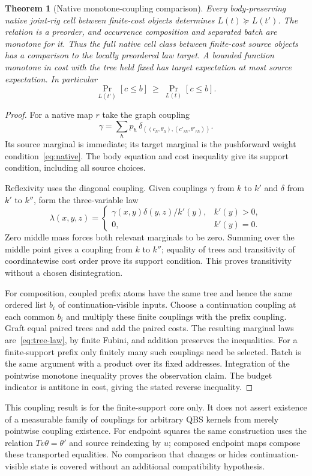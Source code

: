 \documentclass[11pt,a4paper]{article}
\newtheorem{theorem}{Theorem}[section]
\theoremstyle{definition}
\begin{document}
\begin{theorem}[Native monotone-coupling comparison]\label{thm:coupling}
Every body-preserving native joint-rig cell between finite-cost objects
determines $L(t)\succeq L(t')$.
The relation is a preorder, and occurrence composition and separated batch
are monotone for it. Thus the full native cell class between finite-cost source objects has
a comparison to the locally preordered law target. A bounded function monotone in cost with the
tree held fixed has target expectation at most source expectation.
In particular
\[
 \Pr_{L(t')}[c\le b]\ \ge\ \Pr_{L(t)}[c\le b].
\]
\end{theorem}
\begin{proof}
For a native map $r$ take the graph coupling
\begin{equation}\label{eq:graph-coupling}
 \gamma=\sum_h p_h\,
 \delta_{((c_h,\theta_h),(c'_{rh},\theta'_{rh}))}.
\end{equation}
Its source marginal is immediate; its target marginal is the pushforward
weight condition~\eqref{eq:native}. The body equation and cost inequality
give its support condition, including all source choices.

Reflexivity uses the diagonal coupling. Given couplings $\gamma$ from
$k$ to $k'$ and $\delta$ from $k'$ to $k''$, form the three-variable law
\[
 \lambda(x,y,z)=
 \begin{cases}
 \gamma(x,y)\delta(y,z)/k'(y),&k'(y)>0,\\
 0,&k'(y)=0.
 \end{cases}
\]
Zero middle mass forces both relevant marginals to be zero. Summing over
the middle point gives a coupling from $k$ to $k''$; equality of trees and
transitivity of coordinatewise cost order prove its support condition.
This proves transitivity without a chosen disintegration.

For composition, coupled prefix atoms have the same tree and hence the
same ordered list $b_i$ of continuation-visible inputs. Choose a continuation
coupling at each common $b_i$ and multiply these finite couplings with the
prefix coupling. Graft equal paired trees and add the paired costs.
The resulting marginal laws are~\eqref{eq:tree-law}, by finite Fubini,
and addition preserves the inequalities. For a finite-support prefix only
finitely many such couplings need be selected. Batch is the same argument
with a product over its fixed addresses. Integration of the pointwise
monotone inequality proves the observation claim. The budget indicator is
antitone in cost, giving the stated reverse inequality.
\end{proof}
This coupling result is for the finite-support core only. It does not
assert existence of a measurable family of couplings for arbitrary QBS
kernels from merely pointwise coupling existence.
For endpoint squares the same construction uses the relation
$Tv\theta=\theta'$ and source reindexing by $u$; composed endpoint maps
compose these transported equalities. No comparison that changes or hides
continuation-visible state is covered without an additional compatibility
hypothesis.
\end{document}
